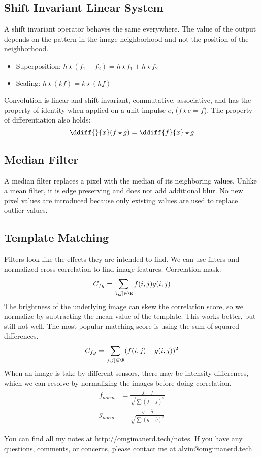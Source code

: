 \documentclass{math}
\begin{document}
\subsection*{Shift Invariant Linear System}
A shift invariant operator behaves the same everywhere. The value of the output
depends on the pattern in the image neighborhood and not the position of the
neighborhood.
\begin{itemize}
  \item Superposition: \( h\star(f_1+f_2) = h\star f_1+h\star f_2 \)
  \item Scaling: \( h\star(kf) = k\star(hf) \)
\end{itemize}
Convolution is linear and shift invariant, commutative, associative, and has the
property of identity when applied on a unit impulse \( e \),
(\( f\star e = f \)). The property of differentiation also holds:
\[ \ddiff{}{x}(f\star g) = \ddiff{f}{x}\star g \]

\subsection*{Median Filter}
A median filter replaces a pixel with the median of its neighboring values.
Unlike a mean filter, it is edge preserving and does not add additional blur.
No new pixel values are introduced because only existing values are used to
replace outlier values.

\subsection*{Template Matching}
Filters look like the effects they are intended to find. We can use filters
and normalized cross-correlation to find image features. Correlation mask:
\[ C_{fg} = \sum_{[i,j]\in\R}f(i,j)g(i,j) \]
The brightness of the underlying image can skew the correlation score, so we
normalize by subtracting the mean value of the template. This works better, but
still not well. The most popular matching score is using the sum of squared
differences.
\[ C_{fg} = \sum_{[i,j]\in\R}(f(i,j)-g(i,j))^2 \]
When an image is take by different sensors, there may be intensity differences,
which we can resolve by normalizing the images before doing correlation.
\begin{align*}
  f_{norm} &= \frac{f-\bar{f}}{\sqrt{\sum(f-\bar{f})^2}} \\
  g_{norm} &= \frac{g-\bar{g}}{\sqrt{\sum(g-\bar{g})^2}}
\end{align*}

\begin{center}
  You can find all my notes at \url{http://omgimanerd.tech/notes}. If you have
  any questions, comments, or concerns, please contact me at
  alvin@omgimanerd.tech
\end{center}
\end{document}
